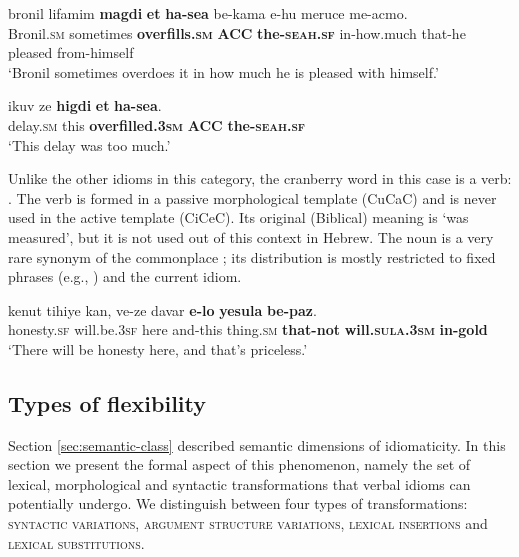 \documentclass[output=paper]{langsci/langscibook}
\begin{document}
 	\ea\label{seah-canon1}
     	\gll bronil lif{\ayin}amim \textbf{magdi{\shin}} \textbf{{\alef}et} \textbf{ha-se{\alef}a} be-kama {\shin}e-hu meruce me-{\ayin}acmo.\\
     	  Bronil.\textsc{sm} sometimes \textbf{overfills.\textsc{sm}} \textbf{ACC} \textbf{the-\textsc{seah}.\textsc{sf}} in-how.much that-he pleased from-himself\\
     	\glt `Bronil sometimes overdoes it in how much he is pleased with himself.'
 	\z

 	\ea\label{seah-canon2}
     	\gll {\ayin}ikuv ze \textbf{higdi{\shin}} \textbf{{\alef}et} \textbf{ha-se{\alef}a}.\\
     	  delay.\textsc{sm} this \textbf{overfilled.\textsc{3sm}} \textbf{ACC} \textbf{the-\textsc{seah}.\textsc{sf}}\\
     	\glt `This delay was too much.'
 	\z

\noindent\textbf{} Unlike the other idioms in this category, the cranberry word in this case is a verb: . The verb is formed in a passive morphological template (CuCaC) and is never used in the active template (CiCeC). Its original (Biblical) meaning is `was measured', but it is not used out of this context in Hebrew. The noun  is a very rare synonym of the commonplace ; its distribution is mostly restricted to fixed phrases (e.g., ) and the current idiom.

	\ea\label{yesula-canon}
    	\gll kenut tihiye kan, ve-ze davar \textbf{{\shin}e-lo} \textbf{yesula} \textbf{be-paz}.\\
    	   honesty.\textsc{sf} will.be.\textsc{3sf} here and-this thing.\textsc{sm} \textbf{that-not} \textbf{will.\textsc{sula}.\textsc{3sm}} \textbf{in-gold}\\
    	\glt `There will be honesty here, and that's priceless.'
	\z


\subsection{Types of flexibility}

Section \ref{sec:semantic-class} described semantic dimensions of idiomaticity. In this section we present the formal aspect of this phenomenon, namely the set of lexical, morphological and syntactic transformations that verbal idioms can potentially undergo. We distinguish between four types of transformations: {\scshape syntactic variations}, {\scshape argument structure variations}, {\scshape lexical insertions} and {\scshape lexical substitutions}.
\end{document}
